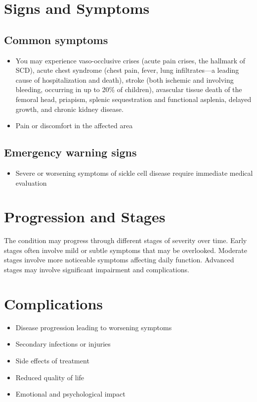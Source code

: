 \section{Signs and Symptoms}

\subsection{Common symptoms}
\begin{itemize}[noitemsep]
  \item You may experience vaso-occlusive crises (acute pain crises, the hallmark of SCD), acute chest syndrome (chest pain, fever, lung infiltrates---a leading cause of hospitalization and death), stroke (both ischemic and involving bleeding, occurring in up to 20\% of children), avascular tissue death of the femoral head, priapism, splenic sequestration and functional asplenia, delayed growth, and chronic kidney disease.

  \item Pain or discomfort in the affected area
  \end{itemize}

\subsection{Emergency warning signs}
\begin{itemize}[noitemsep]
  \item Severe or worsening symptoms of sickle cell disease require immediate medical evaluation
\end{itemize}
\section{Progression and Stages}
The condition may progress through different stages of severity over time. Early stages often involve mild or subtle symptoms that may be overlooked. Moderate stages involve more noticeable symptoms affecting daily function. Advanced stages may involve significant impairment and complications.
\section{Complications}
\begin{itemize}[noitemsep]
  \item Disease progression leading to worsening symptoms
  \item Secondary infections or injuries
  \item Side effects of treatment
  \item Reduced quality of life
  \item Emotional and psychological impact
\end{itemize}
